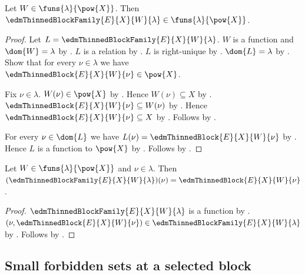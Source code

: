 \begin{theorem}\label{edm_thinned_block_family_type}
    Let $W\in\funs{\lambda}{\pow{X}}$.
    Then $\edmThinnedBlockFamily{E}{X}{W}{\lambda}
        \in\funs{\lambda}{\pow{X}}$.
\end{theorem}
\begin{proof}
    Let $L=\edmThinnedBlockFamily{E}{X}{W}{\lambda}$.
    $W$ is a function and $\dom{W}=\lambda$ by
        .
    $L$ is a relation by
        .
    $L$ is right-unique by
        .
    $\dom{L}=\lambda$ by
        .
    Show that for every $\nu\in\lambda$ we have
        $\edmThinnedBlock{E}{X}{W}{\nu}\in\pow{X}$.
    \begin{subproof}
        Fix $\nu\in\lambda$.
        $W(\nu)\in\pow{X}$ by .
        Hence $W(\nu)\subseteq X$ by .
        $\edmThinnedBlock{E}{X}{W}{\nu}\subseteq W(\nu)$ by
            .
        Hence $\edmThinnedBlock{E}{X}{W}{\nu}\subseteq X$ by
            .
        Follows by .
    \end{subproof}
    For every $\nu\in\dom{L}$ we have
        $L(\nu)=\edmThinnedBlock{E}{X}{W}{\nu}$ by
        .
    Hence $L$ is a function to $\pow{X}$ by \auto.
    Follows by .
\end{proof}

\begin{proposition}\label{edm_thinned_block_family_apply}
    Let $W\in\funs{\lambda}{\pow{X}}$ and $\nu\in\lambda$.
    Then $(\edmThinnedBlockFamily{E}{X}{W}{\lambda})(\nu)
        =\edmThinnedBlock{E}{X}{W}{\nu}$.
\end{proposition}
\begin{proof}
    $\edmThinnedBlockFamily{E}{X}{W}{\lambda}$ is a function by
        .
    $(\nu,\edmThinnedBlock{E}{X}{W}{\nu})
        \in\edmThinnedBlockFamily{E}{X}{W}{\lambda}$ by
        .
    Follows by .
\end{proof}

\subsection{Small forbidden sets at a selected block}

